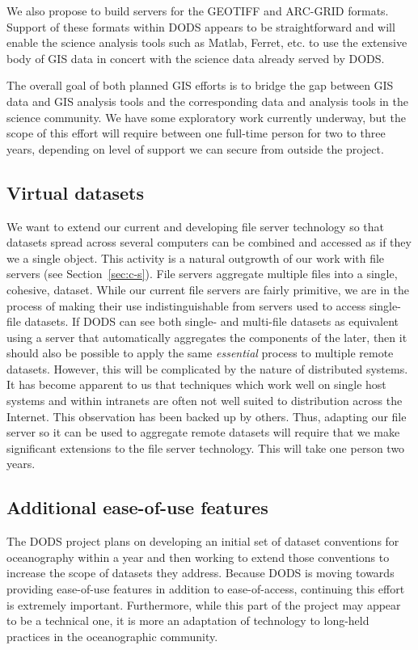 \documentclass[10pt]{article}
\begin{document}
We also propose to build servers for the GEOTIFF and ARC-GRID formats.
Support of these formats within DODS appears to be straightforward and will
enable the science analysis tools such as Matlab, Ferret, etc. to use the
extensive body of GIS data in concert with the science data already served by
DODS.  

The overall goal of both planned GIS efforts is to bridge the gap between GIS
data and GIS analysis tools and the corresponding data and analysis tools in
the science community. We have some exploratory work currently underway, but
the scope of this effort will require between one full-time person for
two to three years, depending on level of support we can secure from outside
the project.

\subsection{Virtual datasets}
We want to extend our current and developing file server technology so that
datasets spread across several computers can be combined and accessed as if
they we a single object. This activity is a natural outgrowth of our work
with file servers (see Section~\ref{sec:c-s}). File servers aggregate
multiple files into a single, cohesive, dataset. While our current file
servers are fairly primitive, we are in the process of making their use
indistinguishable from servers used to access single-file datasets. If DODS
can see both single- and multi-file datasets as equivalent using a server
that automatically aggregates the components of the later, then it should
also be possible to apply the same \emph{essential} process to multiple
remote datasets. However, this will be complicated by the nature of
distributed systems. It has become apparent to us that techniques which work
well on single host systems and within intranets are often not well suited to
distribution across the Internet. This observation has been backed up by
others\cite{waldo:dist-comp}. Thus, adapting our file server so it can be
used to aggregate remote datasets will require that we make significant
extensions to the file server technology. This will take one person two years.

\subsection{Additional ease-of-use features}

The DODS project plans on developing an initial set of dataset conventions
for oceanography within a year and then working to extend those conventions
to increase the scope of datasets they address. Because DODS is moving
towards providing ease-of-use features in addition to ease-of-access,
continuing this effort is extremely important. Furthermore, while this part
of the project may appear to be a technical one, it is more an adaptation of
technology to long-held practices in the oceanographic community. 
\end{document}
